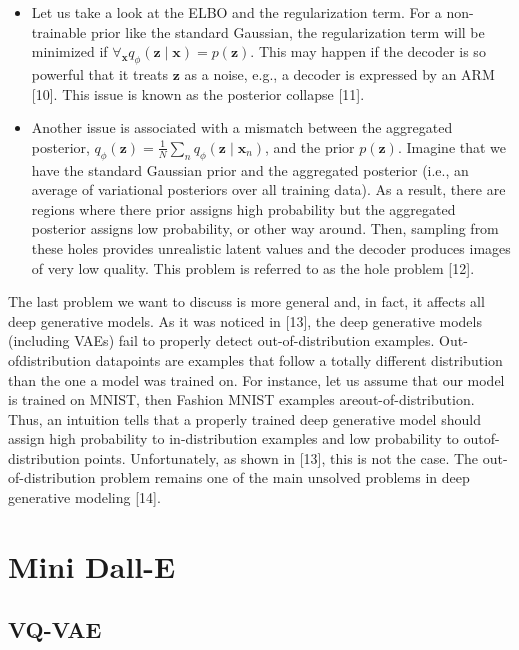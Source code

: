 \documentclass{article}
\begin{document}
\begin{appendix}
{\begin{itemize}
    \item Let us take a look at the ELBO and the regularization term. For a non-trainable prior like the standard Gaussian, the regularization term will be minimized if $\forall_{\mathbf{x}} q_{\phi}(\mathbf{z} \mid \mathbf{x})=p(\mathbf{z})$. This may happen if the decoder is so powerful that it treats $\mathbf{z}$ as a noise, e.g., a decoder is expressed by an ARM [10]. This issue is known as the posterior collapse [11].
    \item Another issue is associated with a mismatch between the aggregated posterior, $q_{\phi}(\mathbf{z})=\frac{1}{N} \sum_{n} q_{\phi}\left(\mathbf{z} \mid \mathbf{x}_{n}\right)$, and the prior $p(\mathbf{z})$. Imagine that we have the standard Gaussian prior and the aggregated posterior (i.e., an average of variational posteriors over all training data). As a result, there are regions where there prior assigns high probability but the aggregated posterior assigns low probability, or other way around. Then, sampling from these holes provides unrealistic latent values and the decoder produces images of very low quality. This problem is referred to as the hole problem [12].
\end{itemize}

The last problem we want to discuss is more general and, in fact, it affects all deep generative models. As it was noticed in [13], the deep generative models (including VAEs) fail to properly detect out-of-distribution examples. Out-ofdistribution datapoints are examples that follow a totally different distribution than the one a model was trained on. For instance, let us assume that our model is trained on MNIST, then Fashion MNIST examples areout-of-distribution. Thus, an intuition tells that a properly trained deep generative model should assign high probability to in-distribution examples and low probability to outof-distribution points. Unfortunately, as shown in [13], this is not the case. The out-of-distribution problem remains one of the main unsolved problems in deep generative modeling [14].}

\section{Mini Dall-E}

\subsection{VQ-VAE}




\end{appendix}
\end{document}

